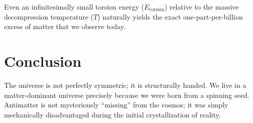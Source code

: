 Even an infinitesimally small torsion energy ($E_{\mathrm{torsion}}$) relative to the massive decompression temperature ($T$) naturally yields the exact one-part-per-billion excess of matter that we observe today.

\section{Conclusion}
The universe is not perfectly symmetric; it is structurally handed. We live in a matter-dominant universe precisely because we were born from a spinning seed. Antimatter is not mysteriously ``missing'' from the cosmos; it was simply mechanically disadvantaged during the initial crystallization of reality.
